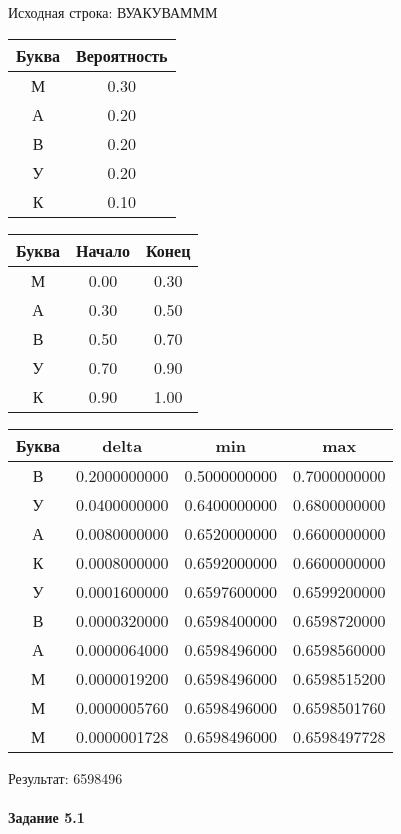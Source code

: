 \documentclass[a4paper, 12pt]{article}
\begin{document}
Исходная строка: ВУАКУВАМММ\
\begin{center}
 \begin{tabular}{ |c|c| } 
  \hline
     Буква & Вероятность \\ \hline
М & 0.30\\\hline
А & 0.20\\\hline
В & 0.20\\\hline
У & 0.20\\\hline
К & 0.10
\\ \hline \end{tabular}
\end{center}
\begin{center}
 \begin{tabular}{ |c|c|c| } 
  \hline
     Буква & Начало & Конец \\ \hline
М & 0.00 & 0.30\\\hline
А & 0.30 & 0.50\\\hline
В & 0.50 & 0.70\\\hline
У & 0.70 & 0.90\\\hline
К & 0.90 & 1.00
\\ \hline \end{tabular}
\end{center}
\begin{center}
 \begin{tabular}{ |c|c|c|c| } 
  \hline
     Буква & delta & min & max \\ \hline
В & 0.2000000000 & 0.5000000000 & 0.7000000000\\\hline
У & 0.0400000000 & 0.6400000000 & 0.6800000000\\\hline
А & 0.0080000000 & 0.6520000000 & 0.6600000000\\\hline
К & 0.0008000000 & 0.6592000000 & 0.6600000000\\\hline
У & 0.0001600000 & 0.6597600000 & 0.6599200000\\\hline
В & 0.0000320000 & 0.6598400000 & 0.6598720000\\\hline
А & 0.0000064000 & 0.6598496000 & 0.6598560000\\\hline
М & 0.0000019200 & 0.6598496000 & 0.6598515200\\\hline
М & 0.0000005760 & 0.6598496000 & 0.6598501760\\\hline
М & 0.0000001728 & 0.6598496000 & 0.6598497728
\\ \hline \end{tabular}
\end{center}
Результат: 6598496
\pagebreak
\paragraph{Задание 5.1}
\end{document}
